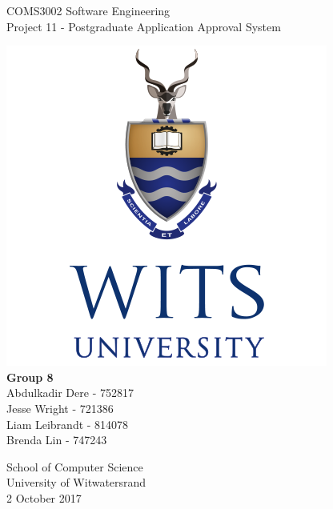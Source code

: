 \documentclass{article}
\begin{document}
\begin{titlepage}
    \begin{center}
        \vspace*{1cm}
        \huge COMS3002 Software Engineering \\
        \LARGE Project 11 - Postgraduate Application Approval System
        
		\vspace{1.5cm}        
		
		\includegraphics[scale=0.5]{witsLogo.png} \\		
		\vspace{1.5cm}
        \textbf{Group 8} \\
        \large Abdulkadir Dere - 752817\\
        Jesse Wright - 721386 \\
        Liam Leibrandt - 814078\\
        Brenda Lin - 747243 \\
        
		\vspace{1.5cm} 
		       
                
        School of Computer Science\\
        University of Witwatersrand\\
        2 October 2017
        
    \end{center}
\end{titlepage}

\tableofcontents
\end{document}
